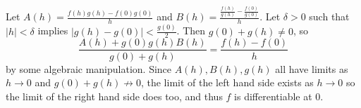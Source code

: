 Let $A(h)=\frac{f(h)g(h)-f(0)g(0)}{h}$ and $B(h)=\frac{\frac{f(h)}{g(h)}-\frac{f(0)}{g(0)}}{h}$. Let $\delta>0$ such that $|h|<\delta$ implies $|g(h)-g(0)|<\frac{g(0)}{2}$. Then $g(0)+g(h)\neq0$, so
\[
	\frac{A(h)+g(0)g(h)B(h)}{g(0)+g(h)}=\frac{f(h)-f(0)}{h}
\]
by some algebraic manipulation. Since $A(h),B(h),g(h)$ all have limits as $h\to0$ and $g(0)+g(h)\not\to0$, the limit of the left hand side exists as $h\to0$ so the limit of the right hand side does too, and thus $f$ is differentiable at $0$.